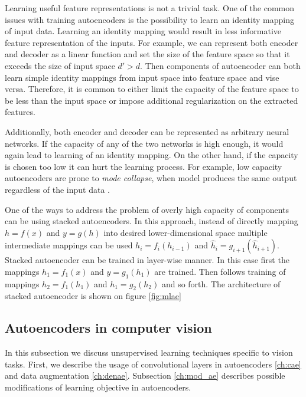 Learning useful feature representations is not a trivial task.
One of the common issues with training autoencoders is the possibility to learn an identity mapping of input data.
Learning an identity mapping would result in less informative feature representation of the inputs.
For example, we can represent both encoder and decoder as a linear function and set the size of the feature space so that it exceeds the size of input space $d' > d$.
Then components of autoencoder can both learn simple identity mappings from input space into feature space and vise versa.
Therefore, it is common to either limit the capacity of the feature space to be less than the input space or impose additional regularization on the extracted features.

Additionally, both encoder and decoder can be represented as arbitrary neural networks.
If the capacity of any of the two networks is high enough, it would again lead to learning of an identity mapping.
On the other hand, if the capacity is chosen too low it can hurt the learning process.
For example, low capacity autoencoders are prone to \textit{mode collapse}, when model produces the same output regardless of the input data \cite{Radford2015}.

One of the ways to address the problem of overly high capacity of components can be using stacked autoencoders.
In this approach, instead of directly mapping $h=f(x)$ and $y=g(h)$ into desired lower-dimensional space multiple intermediate mappings can be used $h_i=f_i(h_{i-1})$ and $\hat{h}_i=g_{i+1}(\hat{h}_{i+1})$.
Stacked autoencoder can be trained in layer-wise manner.
In this case first the mappings $h_1=f_1(x)$  and $y=g_1(h_1)$ are trained.
Then follows training of mappings $h_2=f_1(h_1)$ and $h_1=g_2(h_2)$ and so forth.
The architecture of stacked autoencoder is shown on figure \ref{fig:mlae}




\subsection{Autoencoders in computer vision}\label{ch:dcae}

In this subsection we discuss unsupervised learning techniques specific to vision tasks.
First, we describe the usage of convolutional layers in autoencoders \ref{ch:cae} and data augmentation \ref{ch:denae}.
Subsection \ref{ch:mod_ae} describes possible modifications of learning objective in autoencoders.

